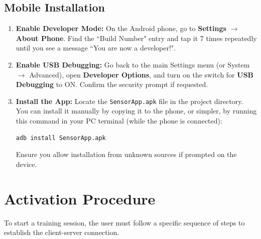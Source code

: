 \subsection{Mobile Installation}
\begin{enumerate}
    \item \textbf{Enable Developer Mode:} On the Android phone, go to \textbf{Settings} $\rightarrow$ \textbf{About Phone}. Find the ``Build Number" entry and tap it 7 times repeatedly until you see a message ``You are now a developer!".

    \item \textbf{Enable USB Debugging:} Go back to the main Settings menu (or System $\rightarrow$ Advanced), open \textbf{Developer Options}, and turn on the switch for \textbf{USB Debugging} to ON. Confirm the security prompt if requested.
    
    

    \item \textbf{Install the App:} Locate the \texttt{SensorApp.apk} file in the project directory. You can install it manually by copying it to the phone, or simpler, by running this command in your PC terminal (while the phone is connected):
    \begin{lstlisting}[language=bash]
    adb install SensorApp.apk
    \end{lstlisting}
    Ensure you allow installation from unknown sources if prompted on the device.
\end{enumerate}

\section{Activation Procedure}

To start a training session, the user must follow a specific sequence of steps to establish the client-server connection.

